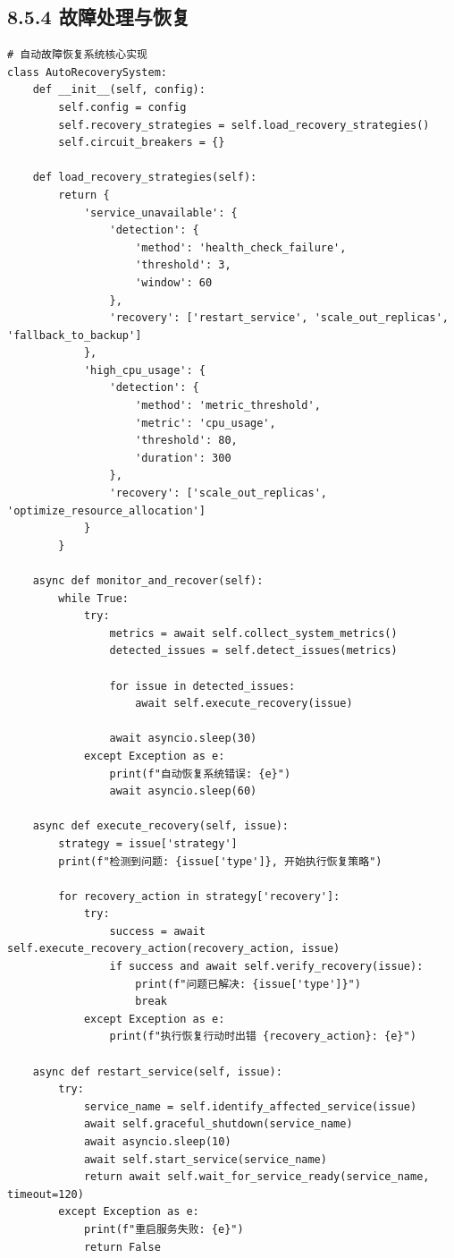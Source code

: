 \hypertarget{ux6545ux969cux5904ux7406ux4e0eux6062ux590d}{%
\subsection{8.5.4 故障处理与恢复}\label{ux6545ux969cux5904ux7406ux4e0eux6062ux590d}}

\begin{lstlisting}[style=python]
# 自动故障恢复系统核心实现
class AutoRecoverySystem:
    def __init__(self, config):
        self.config = config
        self.recovery_strategies = self.load_recovery_strategies()
        self.circuit_breakers = {}
        
    def load_recovery_strategies(self):
        return {
            'service_unavailable': {
                'detection': {
                    'method': 'health_check_failure',
                    'threshold': 3,
                    'window': 60
                },
                'recovery': ['restart_service', 'scale_out_replicas', 'fallback_to_backup']
            },
            'high_cpu_usage': {
                'detection': {
                    'method': 'metric_threshold',
                    'metric': 'cpu_usage',
                    'threshold': 80,
                    'duration': 300
                },
                'recovery': ['scale_out_replicas', 'optimize_resource_allocation']
            }
        }
    
    async def monitor_and_recover(self):
        while True:
            try:
                metrics = await self.collect_system_metrics()
                detected_issues = self.detect_issues(metrics)
                
                for issue in detected_issues:
                    await self.execute_recovery(issue)
                    
                await asyncio.sleep(30)
            except Exception as e:
                print(f"自动恢复系统错误: {e}")
                await asyncio.sleep(60)
    
    async def execute_recovery(self, issue):
        strategy = issue['strategy']
        print(f"检测到问题: {issue['type']}, 开始执行恢复策略")
        
        for recovery_action in strategy['recovery']:
            try:
                success = await self.execute_recovery_action(recovery_action, issue)
                if success and await self.verify_recovery(issue):
                    print(f"问题已解决: {issue['type']}")
                    break
            except Exception as e:
                print(f"执行恢复行动时出错 {recovery_action}: {e}")
    
    async def restart_service(self, issue):
        try:
            service_name = self.identify_affected_service(issue)
            await self.graceful_shutdown(service_name)
            await asyncio.sleep(10)
            await self.start_service(service_name)
            return await self.wait_for_service_ready(service_name, timeout=120)
        except Exception as e:
            print(f"重启服务失败: {e}")
            return False
\end{lstlisting}

